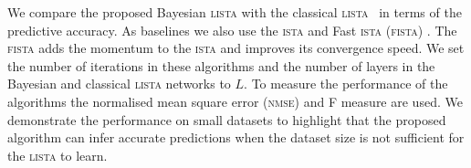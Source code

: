 \documentclass{article}
\begin{document}
We compare the proposed Bayesian \textsc{lista} with the classical \textsc{lista}~\citep{gregor2010learning} in terms of the predictive accuracy. As baselines we also use the \textsc{ista} \citep{daubechies2004iterative} and Fast \textsc{ista} (\textsc{fista}) \citep{beck2009fast}. The \textsc{fista} adds the momentum to the \textsc{ista} and improves its convergence speed. We set the number of iterations in these algorithms and the number of layers in the Bayesian and classical \textsc{lista} networks to $L$. To measure the performance of the algorithms the normalised mean square error (\textsc{nmse}) and F measure are used. We demonstrate the performance on small datasets to highlight that the proposed algorithm can infer accurate predictions when the dataset size is not sufficient for the \textsc{lista} to learn.
\end{document}
